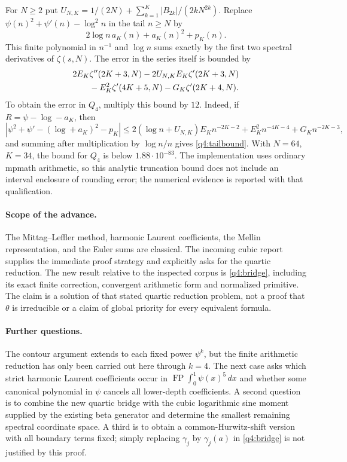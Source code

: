\documentclass[11pt,a4paper]{article}
\numberwithin{equation}{section}
\theoremstyle{definition}
\theoremstyle{remark}
\begin{document}
For $N\geq2$ put
$U_{N,K}=1/(2N)+\sum_{k=1}^K|B_{2k}|/(2kN^{2k})$.
Replace $\psi(n)^2+\psi'(n)-\log^2n$ in the tail $n\geq N$ by
\[
 2\log n\,a_K(n)+a_K(n)^2+p_K(n).
\]
This finite polynomial in $n^{-1}$ and $\log n$ sums exactly by the first
two spectral derivatives of $\zeta(s,N)$.  The error in the series
itself is bounded by
\begin{align}\label{q4:tailbound}
 &2E_K\zeta''(2K+3,N)
    -2U_{N,K}E_K\zeta'(2K+3,N)\notag\\
 &\qquad{}-E_K^2\zeta'(4K+5,N)
    -G_K\zeta'(2K+4,N).
\end{align}
To obtain the error in $Q_4$, multiply this bound by $12$.
Indeed, if $R=\psi-\log-a_K$, then
\[
 |\psi^2+\psi'-(\log+a_K)^2-p_K|
 \leq2(\log n+U_{N,K})E_Kn^{-2K-2}
          +E_K^2n^{-4K-4}+G_Kn^{-2K-3},
\]
and summing after multiplication by $\log n/n$ gives
\eqref{q4:tailbound}.  With $N=64$, $K=34$, the bound for $Q_4$ is
below $1.88\cdot10^{-83}$.  The implementation uses ordinary mpmath
arithmetic, so this analytic truncation bound does not include an
interval enclosure of rounding error; the numerical evidence is
reported with that qualification.

\paragraph{Scope of the advance.}
The Mittag--Leffler method, harmonic Laurent coefficients, the Mellin
representation, and the Euler sums are classical.  The incoming cubic
report supplies the immediate proof strategy and explicitly asks for
the quartic reduction.  The new result relative to the inspected corpus
is \eqref{q4:bridge}, including its exact finite correction, convergent
arithmetic form and normalized primitive.  The claim is a solution of
that stated quartic reduction problem, not a proof that $\theta$ is
irreducible or a claim of global priority for every equivalent formula.

\paragraph{Further questions.}
The contour argument extends to each fixed power $\psi^k$, but the finite
arithmetic reduction has only been carried out here through $k=4$.
The next case asks which strict harmonic Laurent coefficients occur in
$\operatorname{FP}\int_0^1\psi(x)^5\,dx$ and whether some canonical
polynomial in $\psi$ cancels all lower-depth coefficients.  A second
question is to combine the new quartic bridge with the cubic logarithmic
sine moment supplied by the existing beta generator and determine the
smallest remaining spectral coordinate space.  A third is to obtain a
common-Hurwitz-shift version with all boundary terms fixed; simply
replacing $\gamma_j$ by $\gamma_j(a)$ in \eqref{q4:bridge} is not
justified by this proof.
\end{document}
